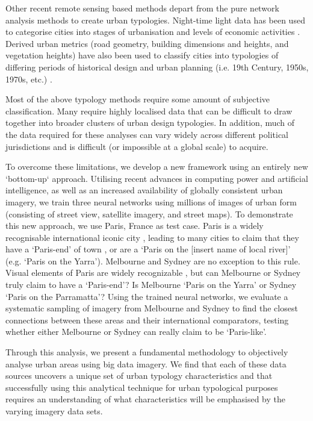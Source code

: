 \documentclass[10pt,letterpaper,hidelinks]{article}
\begin{document}
Other recent remote sensing based methods depart from the pure network analysis methods to create urban typologies. Night-time light data has been used to categorise cities into stages of urbanisation and levels of economic activities \cite{Zhang2013}. Derived urban metrics (road geometry, building dimensions and heights, and vegetation heights) have also been used to classify cities into typologies of differing periods of historical design and urban planning (i.e. 19th Century, 1950s, 1970s, etc.) \cite{Hermosilla2014}.

Most of the above typology methods require some amount of subjective classification. Many require highly localised data that can be difficult to draw together into broader clusters of urban design typologies. In addition, much of the data required for these analyses can vary widely across different political jurisdictions and is difficult (or impossible at a global scale) to acquire. 

To overcome these limitations, we develop a new framework using an entirely new `bottom-up` approach. Utilising recent advances in computing power and artificial intelligence, as well as an increased availability of globally consistent urban imagery, we train three neural networks using millions of images of urban form (consisting of street view, satellite imagery, and street maps). To demonstrate this new approach, we use Paris, France as test case. Paris is a widely recognisable international iconic city \cite{Anholt2006}, leading to many cities to claim that they have a `Paris-end' of town \cite{Williams2010}, or are a `Paris on the [insert name of local river]' \cite{Wilden2013} (e.g. `Paris on the Yarra'). Melbourne and Sydney are no exception to this rule. Visual elements of Paris are widely recognizable \cite{Doersch2012}, but can Melbourne or Sydney truly claim to have a `Paris-end'? Is Melbourne `Paris on the Yarra' or Sydney `Paris on the Parramatta'? Using the trained neural networks, we evaluate a systematic sampling of imagery from Melbourne and Sydney to find the closest connections between these areas and their international comparators, testing whether either Melbourne or Sydney can really claim to be `Paris-like'.

Through this analysis, we present a fundamental methodology to objectively analyse urban areas using big data imagery. We find that each of these data sources uncovers a unique set of urban typology characteristics and that successfully using this analytical technique for urban typological purposes requires an understanding of what characteristics will be emphasised by the varying imagery data sets.
\end{document}
